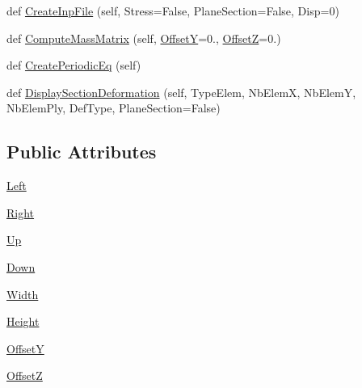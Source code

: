 \begin{DoxyCompactItemize}
\item 
def \hyperlink{classgebtaero_1_1_composite_box_1_1_composite_box_a005e7c9de0e4307ad9ff7ed4e8f7c8a4}{Create\+Inp\+File} (self, Stress=False, Plane\+Section=False, Disp=0)
\item 
def \hyperlink{classgebtaero_1_1_composite_box_1_1_composite_box_a6b944eeef7002377d7b83c5dd6ae6550}{Compute\+Mass\+Matrix} (self, \hyperlink{classgebtaero_1_1_composite_box_1_1_composite_box_a26fcf7763030afb28f45f2354125c352}{OffsetY}=0., \hyperlink{classgebtaero_1_1_composite_box_1_1_composite_box_a50e38078e66133a95f34f2d9176329d9}{OffsetZ}=0.)
\item 
def \hyperlink{classgebtaero_1_1_composite_box_1_1_composite_box_a9328777b54ead0767f0075fe599b09d9}{Create\+Periodic\+Eq} (self)
\item 
def \hyperlink{classgebtaero_1_1_composite_box_1_1_composite_box_a9ea871cc97fc62978a19b3a46526ed07}{Display\+Section\+Deformation} (self, Type\+Elem, Nb\+ElemX, Nb\+ElemY, Nb\+Elem\+Ply, Def\+Type, Plane\+Section=False)
\end{DoxyCompactItemize}
\subsection*{Public Attributes}
\begin{DoxyCompactItemize}
\item 
\hyperlink{classgebtaero_1_1_composite_box_1_1_composite_box_a7bfe2dab84e5ae8d8cdba1337b89c309}{Left}
\item 
\hyperlink{classgebtaero_1_1_composite_box_1_1_composite_box_a61cdca93cc1f5ef451192395fc50b67b}{Right}
\item 
\hyperlink{classgebtaero_1_1_composite_box_1_1_composite_box_a4c043150a29d71b986a91f21be6a4e47}{Up}
\item 
\hyperlink{classgebtaero_1_1_composite_box_1_1_composite_box_ad1559917cabe3fcb6c05bf603d8b0b0c}{Down}
\item 
\hyperlink{classgebtaero_1_1_composite_box_1_1_composite_box_a44593d7302ceb1c46ac637437b5e1061}{Width}
\item 
\hyperlink{classgebtaero_1_1_composite_box_1_1_composite_box_affc2b38183c3b0ec7534629cf63e4cc5}{Height}
\item 
\hyperlink{classgebtaero_1_1_composite_box_1_1_composite_box_a26fcf7763030afb28f45f2354125c352}{OffsetY}
\item 
\hyperlink{classgebtaero_1_1_composite_box_1_1_composite_box_a50e38078e66133a95f34f2d9176329d9}{OffsetZ}
\end{DoxyCompactItemize}


